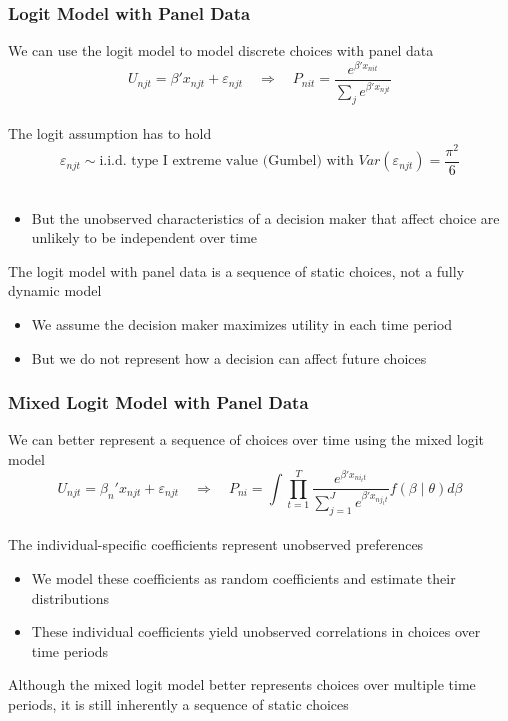 \documentclass{beamer}
\begin{document}
\begin{frame}\frametitle{Logit Model with Panel Data}
    We can use the logit model to model discrete choices with panel data
    $$U_{njt} = \beta' x_{njt} + \varepsilon_{njt} \quad \Rightarrow \quad P_{nit} = \frac{e^{\beta' x_{nit}}}{\sum_j e^{\beta' x_{njt}}}$$ \\
    \vspace{2ex}
    The logit assumption has to hold
    $$\varepsilon_{njt} \sim \text{i.i.d.\ type I extreme value (Gumbel) with } Var(\varepsilon_{njt}) = \frac{\pi^2}{6}$$ \\
    \begin{itemize}
        \item But the unobserved characteristics of a decision maker that affect choice are unlikely to be independent over time
    \end{itemize}
    \vspace{2ex}
    The logit model with panel data is a sequence of static choices, not a fully dynamic model
    \begin{itemize}
        \item We assume the decision maker maximizes utility in each time period
        \item But we do not represent how a decision can affect future choices
    \end{itemize}
\end{frame}

\begin{frame}\frametitle{Mixed Logit Model with Panel Data}
    We can better represent a sequence of choices over time using the mixed logit model
    $$U_{njt} = \beta_n' x_{njt} + \varepsilon_{njt} \quad \Rightarrow \quad P_{ni} = \int \prod_{t = 1}^T \frac{e^{\beta' x_{ni_{t}t}}}{\sum_{j = 1}^J e^{\beta' x_{nj_{t}t}}} f(\beta \mid \theta) d \beta$$ \\
    \vspace{2ex}
    The individual-specific coefficients represent unobserved preferences
    \begin{itemize}
        \item We model these coefficients as random coefficients and estimate their distributions
        \item These individual coefficients yield unobserved correlations in choices over time periods
    \end{itemize}
    \vspace{2ex}
    Although the mixed logit model better represents choices over multiple time periods, it is still inherently a sequence of static choices
\end{frame}
\end{document}
